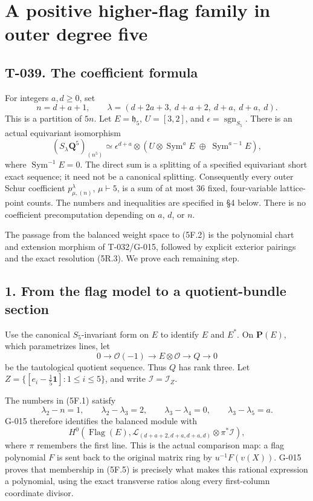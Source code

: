 \documentclass[
  10pt,
]{article}
\begin{document}
\section{A positive higher-flag family in outer degree
five}\label{a-positive-higher-flag-family-in-outer-degree-five}

\subsection{T-039. The coefficient
formula}\label{t-039.-the-coefficient-formula}

For integers \(a,d\ge0\), set \[
n=d+a+1,\qquad
\lambda=(d+2a+3,\ d+a+2,\ d+a,\ d+a,\ d).
\tag{5F.1}
\] This is a partition of \(5n\). Let \(E=\mathfrak h_5\), \(U=[3,2]\),
and \(\epsilon=\operatorname{sgn}_{S_5}\). There is an actual
equivariant isomorphism \[
\boxed{
(S_\lambda\mathbf Q^5)_{(n^5)}
\simeq\epsilon^{d+a}\otimes
\left(U\otimes\operatorname{Sym}^a E
\;\oplus\;\operatorname{Sym}^{a-1}E\right),}
\tag{5F.2}
\] where \(\operatorname{Sym}^{-1}E=0\). The direct sum is a splitting
of a specified equivariant short exact sequence; it need not be a
canonical splitting. Consequently every outer Schur coefficient
\(p_{\mu,(n)}^\lambda\), \(\mu\vdash5\), is a sum of at most 36 fixed,
four-variable lattice-point counts. The numbers and inequalities are
specified in §4 below. There is no coefficient precomputation depending
on \(a\), \(d\), or \(n\).

The passage from the balanced weight space to (5F.2) is the polynomial
chart and extension morphism of T-032/G-015, followed by explicit
exterior pairings and the exact resolution (5R.3). We prove each
remaining step.

\subsection{1. From the flag model to a quotient-bundle
section}\label{from-the-flag-model-to-a-quotient-bundle-section}

Use the canonical \(S_5\)-invariant form on \(E\) to identify \(E\) and
\(E^*\). On \(\mathbf P(E)\), which parametrizes lines, let \[
0\longrightarrow\mathcal O(-1)\longrightarrow E\otimes\mathcal O
\longrightarrow Q\longrightarrow0
\tag{5F.3}
\] be the tautological quotient sequence. Thus \(Q\) has rank three. Let
\(Z=\{[e_i-\frac15\mathbf1]:1\le i\le5\}\), and write
\(\mathcal I=\mathcal I_Z\).

The numbers in (5F.1) satisfy \[
\lambda_2-n=1,\qquad \lambda_2-\lambda_3=2,
\qquad\lambda_3-\lambda_4=0,\qquad\lambda_3-\lambda_5=a.
\tag{5F.4}
\] G-015 therefore identifies the balanced module with \[
H^0\!\left(\operatorname{Flag}(E),
\mathcal L_{(d+a+2,d+a,d+a,d)}\otimes\pi^*\mathcal I\right),
\tag{5F.5}
\] where \(\pi\) remembers the first line. This is the actual comparison
map: a flag polynomial \(F\) is sent back to the original matrix ring by
\(u^{-1}F(v(X))\). G-015 proves that membership in (5F.5) is precisely
what makes this rational expression a polynomial, using the exact
transverse ratios along every first-column coordinate divisor.
\end{document}
